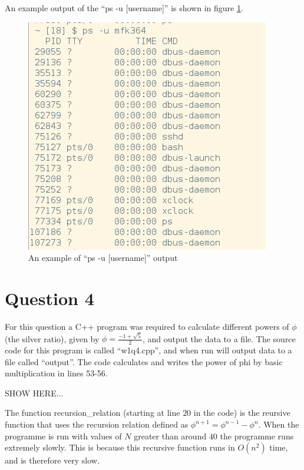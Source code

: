 \documentclass[a4paper,12pt]{UoBnote}
\begin{document}
\begin{enumerate}[label=\alph*)]
		An example output of the ``ps -u [username]'' is shown in figure \ref{fig:ps}. 
		\begin{figure}
			\centering
			\includegraphics[scale=0.3]{ps}
			\caption{An example of ``ps -u [username]'' output}
			\label{fig:ps}
		\end{figure}

\end{enumerate}

\section{Question 4}


For this question a C++ program was required to calculate different powers of $\phi$ (the silver ratio), given by $\phi = \frac{-1 + \sqrt{5}}{2}$, and output the data to a file. The source code for this program is called ``w1q4.cpp'', and when run will output data to a file called ``output''. The code calculates and writes the power of phi by basic multiplication in lines 53-56.

SHOW HERE...

The function recursion\_relation (starting at line $20$ in the code) is the reursive function that uses the recursion relation defined as $\phi^{n+1}=\phi^{n-1}-\phi^{n}$. When the programme is run with values of $N$ greater than around $40$ the programme runs extremely slowly. This is because this recursive function runs in $O(n^2)$ time, and is therefore very slow.
\end{document}
